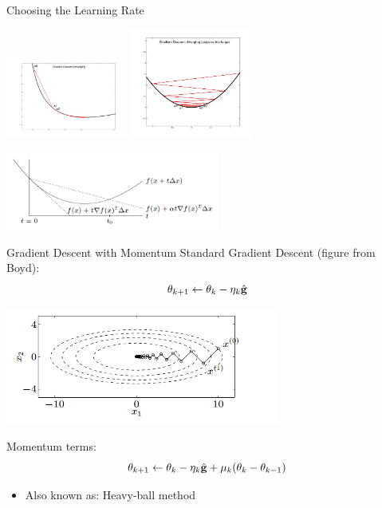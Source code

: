 \documentclass{beamer}
\begin{document}
\begin{frame}{Choosing the Learning Rate}
  \begin{center}
    \includegraphics[width=4cm]{converge}
    \includegraphics[width=4cm]{diverge}
  \end{center}
  

  \begin{center}
    \includegraphics[width=7cm]{grad}
  \end{center}
\end{frame}


\begin{frame}{Gradient Descent with Momentum}
  Standard Gradient Descent (figure from Boyd):
  \[\theta_{k+1} \gets \theta_{k} - \eta_k \hat{\mathbf{g}}\]

  \begin{center}
    \includegraphics[width=9cm]{heavyball}
  \end{center}

  Momentum terms:
  \[\theta_{k+1} \gets \theta_{k} - \eta_k \hat{\mathbf{g}} + \mu_k(\theta_{k} - \theta_{k-1}) \]

  \begin{itemize}
  \item Also known as: Heavy-ball method
  \end{itemize}
\end{frame}
\end{document}

